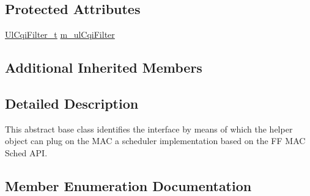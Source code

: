 \subsection*{Protected Attributes}
\begin{DoxyCompactItemize}
\item 
\hyperlink{classns3_1_1FfMacScheduler_aa47a9eb25f2c558c825b0be645304a52}{Ul\+Cqi\+Filter\+\_\+t} \hyperlink{classns3_1_1FfMacScheduler_adae16e66a1c4231da80a1221297442cf}{m\+\_\+ul\+Cqi\+Filter}
\end{DoxyCompactItemize}
\subsection*{Additional Inherited Members}


\subsection{Detailed Description}
This abstract base class identifies the interface by means of which the helper object can plug on the M\+AC a scheduler implementation based on the FF M\+AC Sched A\+PI. 

\subsection{Member Enumeration Documentation}
